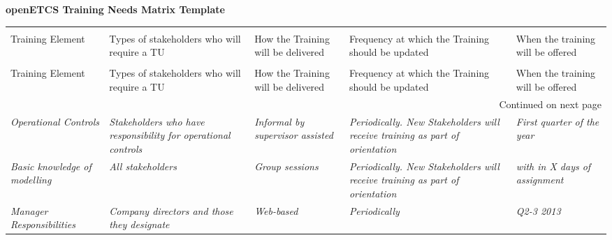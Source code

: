 \documentclass[a4paper, 11pt]{article}
\newcommand{\ra}[1]{\renewcommand{\arraystretch}{#1}}
\begin{document}
\begin{center} \huge\bf openETCS Training Needs Matrix Template\end{center}

\vspace{1\baselineskip}\vspace{-\parskip}

\begin{center}
\begin{longtable}{|m{3.75cm}|m{4cm}|m{6cm}|m{4.5cm}|m{3.25cm}|}
\rowcolor{myblue} \multicolumn{5}{|c|}{Training Needs Matrix Template} \\ \rowcolor{lightgray} 

Training Element & Types of stakeholders who will require a TU & How the Training will be delivered & Frequency at which the Training should be updated & When the training will be offered \\ \hline 
\endfirsthead

\rowcolor{myblue} \multicolumn{5}{|c|}{Training Needs Matrix Template} \\ \rowcolor{lightgray} 

Training Element & Types of stakeholders who will require a TU & How the Training will be delivered & Frequency at which the Training should be updated & When the training will be offered \\ \hline
\endhead

\hline \multicolumn{5}{|r|}{{Continued on next page}} \\ \hline
\endfoot

\hline \hline
\endlastfoot

{\it Operational Controls} &
{\it Stakeholders who have responsibility for operational controls} &
{\it Informal by supervisor assisted} &
{\it Periodically. New Stakeholders will receive training as part of orientation} &
{\it First quarter of the year}
\\\hline
{\it Basic knowledge of modelling} &
{\it All stakeholders} &
{\it Group sessions} &
{\it Periodically. New Stakeholders will receive training as part of orientation} &
{\it with in X days of assignment}
\\\hline
{\it Manager Responsibilities} &
{\it Company directors and those they designate} &
{\it Web-based} &
{\it Periodically} &
{\it Q2-3 2013}
\\\hline
\end{longtable}
\end{center}
\end{document}

